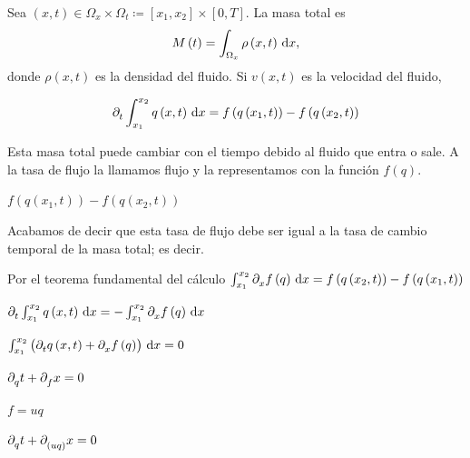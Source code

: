 Sea
\begin{math}
	\left(x,t\right)\in
	\Omega_{x}\times\Omega_{t}\coloneqq
	\left[x_{1},x_{2}\right]\times
	\left[0,T\right]
\end{math}.
La masa total es
\begin{equation*}
	M\left(t\right)=
	\int_{\Omega_{x}}
	\rho\left(x,t\right)
	\dl x,
\end{equation*}
donde $\rho\left(x,t\right)$ es la densidad del fluido.
Si $v\left(x,t\right)$ es la velocidad del fluido,

\begin{equation*}
	\difcp{}{t}\int_{x_{1}}^{x_{2}}
	q\left(x,t\right)\dl x=
	f\left(q\left(x_{1},t\right)\right)-
	f\left(q\left(x_{2},t\right)\right)
\end{equation*}

Esta masa total puede cambiar con el tiempo debido al fluido que
entra o sale.
A la tasa de flujo la llamamos flujo y la representamos con la
función $f\left(q\right)$.

\begin{math}
	f\left(q\left(x_{1},t\right)\right)-
	f\left(q\left(x_{2},t\right)\right)
\end{math}

Acabamos de decir que esta tasa de flujo debe ser igual a la tasa de
cambio temporal de la masa total; es decir.

Por el teorema fundamental del cálculo
\begin{math}
	\int_{x_{1}}^{x_{2}}
	\difcp{}{x}
	f\left(q\right)
	\dl x=
	f\left(q\left(x_{2},t\right)\right)-
	f\left(q\left(x_{1},t\right)\right)
\end{math}

\begin{math}
	\difcp{}{t}
	\int_{x_{1}}^{x_{2}}
	q\left(x,t\right)
	\dl x=
	-\int_{x_{1}}^{x_{2}}
	\difcp{}{x}
	f\left(q\right)
	\dl x
\end{math}

\begin{math}
	\int_{x_{1}}^{x_{2}}
	\left(
	\difcp{}{t}
	q\left(x,t\right)+
	\difcp{}{x}f\left(q\right)
	\right)\dl x=
	0
\end{math}

\begin{math}
	\difcp{t}{q}+\difcp{x}{f}=0
\end{math}

$f=uq$

\begin{math}
	\difcp{t}{q}+
	\difcp{x}{\left(uq\right)}=0
\end{math}

